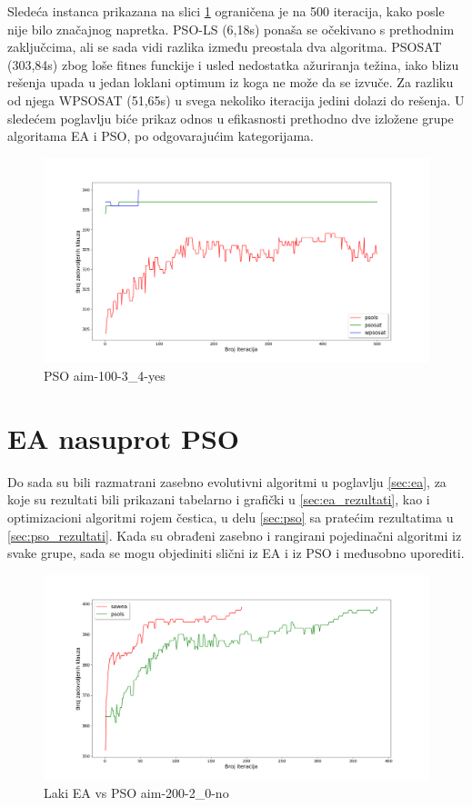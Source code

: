 \documentclass[a4paper]{article}
\begin{document}
Sledeća instanca prikazana na slici \ref{img:pso-100-3-4-yes} ograničena je na 500 iteracija,
kako posle nije bilo značajnog napretka. PSO-LS (6,18s) ponaša se očekivano s prethodnim
zaključcima, ali se sada vidi razlika između preostala dva algoritma. 
PSOSAT (303,84s) zbog loše fitnes funckije i usled nedostatka ažuriranja težina,
iako blizu rešenja upada u jedan loklani optimum iz koga ne može da se izvuče. 
Za razliku od njega WPSOSAT (51,65s) u svega nekoliko iteracija jedini dolazi do rešenja.
U sledećem poglavlju biće prikaz odnos u efikasnosti prethodno dve izložene grupe algoritama
EA i PSO, po odgovarajućim kategorijama.\\

\begin{figure}[h!]
\centering
\includegraphics[width=\textwidth]{pso-aim-100-3_4-yes.png}
\caption{PSO aim-100-3\_4-yes}\label{img:pso-100-3-4-yes}
\end{figure}


\section{EA nasuprot PSO}
\label{EAvsPSO}
Do sada su bili razmatrani zasebno evolutivni algoritmi u poglavlju \ref{sec:ea}, za 
koje su rezultati bili prikazani tabelarno i grafički u \ref{sec:ea_rezultati}, kao i
optimizacioni algoritmi rojem čestica, u delu \ref{sec:pso} sa pratećim rezultatima u 
\ref{sec:pso_rezultati}. Kada su obrađeni zasebno i rangirani pojedinačni
algoritmi iz svake grupe, sada se mogu objediniti slični iz EA i iz PSO i međusobno 
uporediti.

\begin{figure}[h!]
\centering
\includegraphics[width=\textwidth]{ea-pso-aim-200-2_0-no.png}
\caption{Laki EA vs PSO aim-200-2\_0-no}\label{img:EAvsPSO-200-2_0-no}
\end{figure}
\end{document}
